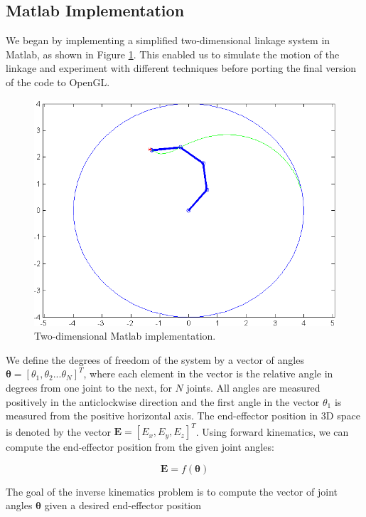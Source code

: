 \documentclass[paper=a4, fontsize=11pt]{scrartcl} %
\numberwithin{equation}{section} %
\numberwithin{figure}{section} %
\numberwithin{table}{section} %
\newcommand{\vect}[1]{\mathbf{#1}}
\newcommand{\params}{\boldsymbol{\theta}}
\begin{document}
\subsection{Matlab Implementation}

We began by implementing a simplified two-dimensional linkage system in Matlab, as shown in Figure \ref{fig:Matlabpicture}. This enabled us to simulate the motion of the linkage and experiment with different techniques before porting the final version of the code to OpenGL. \\

\begin{figure}
\centering
\includegraphics[scale=0.6]{chainMatlab}
\caption{Two-dimensional Matlab implementation.}
\label{fig:Matlabpicture}
\end{figure}

We define the degrees of freedom of the system by a vector of angles $\params = [\theta_1, \theta_2...\theta_N]^T$, where each element in the vector is the relative angle in degrees from one joint to the next, for $N$ joints. All angles are measured positively in the anticlockwise direction and the first angle in the vector $\theta_1$ is measured from the positive horizontal axis. The end-effector position in 3D space is denoted by the vector 
$\vect{E} = [E_x, E_y, E_z]^T$. Using forward kinematics, we can compute the end-effector position from the given joint angles:

\begin{equation}
\vect{E} = f(\params)
\end{equation}

The goal of the inverse kinematics problem is to compute the vector of joint angles $\params$ given a desired end-effector position
\end{document}
